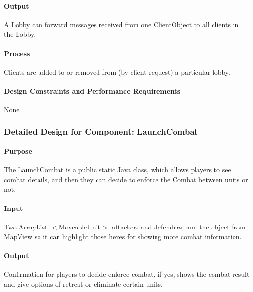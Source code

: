 \documentclass[12pt,a4paper,titlepage]{article}
\begin{document}
\paragraph{Output} A Lobby can forward messages received from one ClientObject to all clients in the Lobby.
\paragraph{Process} Clients are added to or removed from (by client request) a particular lobby. 
\paragraph{Design Constraints and Performance Requirements} None.

\subsubsection{Detailed Design for Component: LaunchCombat}
\paragraph{Purpose} The LaunchCombat is a public static Java class, which allows players to see combat details, and then they can decide to enforce the Combat between units or not.
\paragraph{Input} Two ArrayList $<$MoveableUnit$>$ attackers and defenders, and the object from MapView so it can highlight those hexes for showing more combat information.
\paragraph{Output} Confirmation for players to decide enforce combat, if yes, shows the combat result and give options of retreat or eliminate certain units.
\end{document}
